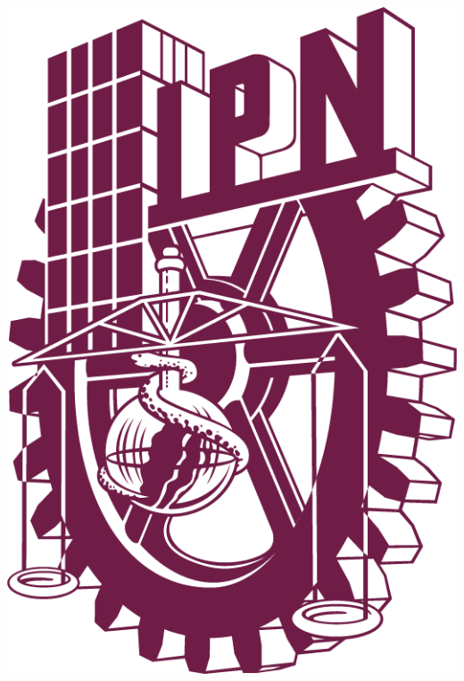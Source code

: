 
\thispagestyle{empty}	%

\begin{center}
	
	\begin{minipage}{0.48\textwidth}
		\begin{flushleft}
			\includegraphics[scale = 0.125]{images/LOGO POLI PANTONE 222 C.png}
		\end{flushleft}
	\end{minipage}
	\begin{minipage}{0.48\textwidth} 

\end{minipage}
\end{center}
